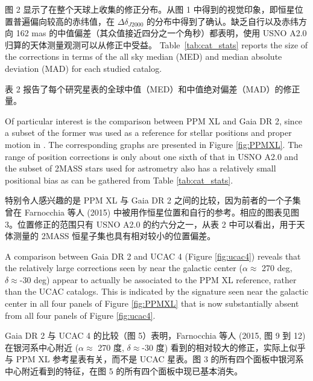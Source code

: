 \documentclass[review]{elsarticle}
\begin{document}
图 2 显示了在整个天球上收集的修正分布。从图 1 中得到的视觉印象，即恒星位置普遍偏向较高的赤纬值，在 $\Delta \delta_{J2000}$ 的分布中得到了确认。缺乏自行以及赤纬方向 162 mas 的中值偏差（其众值接近四分之一个角秒）都表明，使用 USNO A2.0 归算的天体测量观测可以从修正中受益。
%
Table~\ref{tab:cat_stats} reports the size of the corrections in terms of the all sky median (MED) and median absolute deviation (MAD) for each studied catalog. 

表 2 报告了每个研究星表的全球中值（MED）和中值绝对偏差（MAD）的修正量。

%
Of particular interest is the comparison between PPM XL and Gaia DR 2, since a subset of the former was used as a reference for stellar positions and proper motion in \citet{farnocchia15}.
The corresponding graphs are presented in Figure \ref{fig:PPMXL}.
The range of position corrections is only about one sixth of that in USNO A2.0 and the subset of 2MASS stars used for astrometry also has a relatively small positional bias as can be gathered from Table \ref{tab:cat_stats}.

特别令人感兴趣的是 PPM XL 与 Gaia DR 2 之间的比较，因为前者的一个子集曾在 Farnocchia 等人 (2015) 中被用作恒星位置和自行的参考。相应的图表见图 3。位置修正的范围只有 USNO A2.0 的约六分之一，从表 2 中可以看出，用于天体测量的 2MASS 恒星子集也具有相对较小的位置偏差。

%
A comparison between Gaia DR 2 and UCAC 4 (Figure \ref{fig:ucac4}) reveals that
the relatively large corrections seen by \citet[][Figures 9 to 12]{farnocchia15} near the galactic center ($\alpha\approx$ 270 deg, $\delta\approx$-30 deg) appear to actually be associated to the PPM XL reference, rather than the UCAC catalogs. This is indicated by the signature seen near the galactic center in all four panels of Figure \ref{fig:PPMXL} that is now substantially absent from all four panels of Figure \ref{fig:ucac4}.

Gaia DR 2 与 UCAC 4 的比较（图 5）表明，Farnocchia 等人 (2015, 图 9 到 12) 在银河系中心附近 ($\alpha\approx$ 270 度, $\delta\approx$-30 度) 看到的相对较大的修正，实际上似乎与 PPM XL 参考星表有关，而不是 UCAC 星表。图 3 的所有四个面板中银河系中心附近看到的特征，在图 5 的所有四个面板中现已基本消失。

%
\end{document}
